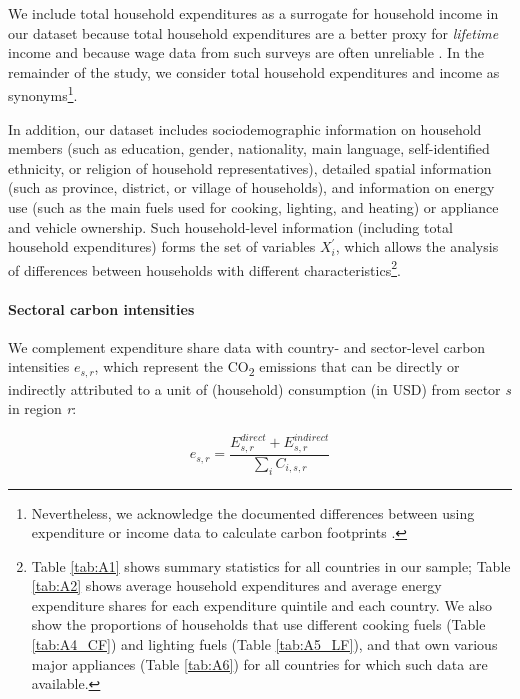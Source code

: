 \documentclass[12pt, a4paper]{article}
\begin{document}
We include total household expenditures as a surrogate for household income in our dataset because total household expenditures are a better proxy for \textit{lifetime} income \autocite{Poterba.1989,Poterba.1991,Cronin.2019} and because wage data from such surveys are often unreliable \autocite{Blundell.1998}. In the remainder of the study, we consider total household expenditures and income as synonyms\footnote{Nevertheless, we acknowledge the documented differences between using expenditure or income data to calculate carbon footprints \autocite[see][]{Levay.2023}.}.

In addition, our dataset includes sociodemographic information on household members (such as education, gender, nationality, main language, self-identified ethnicity, or religion of household representatives), detailed spatial information (such as province, district, or village of households), and information on energy use (such as the main fuels used for cooking, lighting, and heating) or appliance and vehicle ownership. Such household-level information (including total household expenditures) forms the set of variables $X_{i}^{'}$, which allows the analysis of differences between households with different characteristics\footnote{Table \ref{tab:A1} shows summary statistics for all countries in our sample; Table \ref{tab:A2} shows average household expenditures and average energy expenditure shares for each expenditure quintile and each country. We also show the proportions of households that use different cooking fuels (Table \ref{tab:A4_CF}) and lighting fuels (Table \ref{tab:A5_LF}), and that own various major appliances (Table \ref{tab:A6}) for all countries for which such data are available.}.

\paragraph{Sectoral carbon intensities} We complement expenditure share data with country- and sector-level carbon intensities $e_{s,r}$, which represent the  CO\textsubscript{2} emissions that can be directly or indirectly attributed to a unit of (household) consumption (in USD) from sector \textit{s} in region \textit{r}:

\begin{equation}
    e_{s,r} = \frac{E_{s,r}^{direct}+E_{s,r}^{indirect}}{\sum_{i} C_{i,s,r}}
\end{equation}
\end{document}
